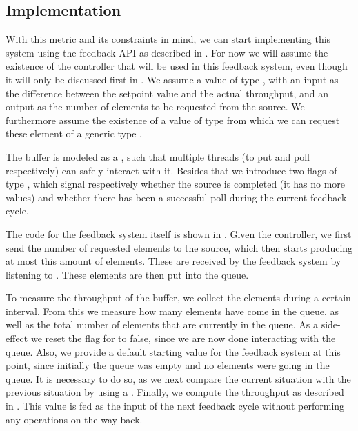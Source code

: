 \subsection*{Implementation}
With this metric and its constraints in mind, we can start implementing this system using the feedback API as described in . For now we will assume the existence of the controller that will be used in this feedback system, even though it will only be discussed first in . We assume a value  of type , with an input as the difference between the setpoint value and the actual throughput, and an output as the number of elements to be requested from the source. We furthermore assume the existence of a value  of type  from which we can request these element of a generic type .

The buffer is modeled as a , such that multiple threads (to put and poll respectively) can safely interact with it. Besides that we introduce two flags of type , which signal respectively whether the source is completed (it has no more values) and whether there has been a successful poll during the current feedback cycle.

The code for the feedback system itself is shown in . Given the controller, we first send the number of requested elements to the source, which then starts producing at most this amount of elements. These are received by the feedback system by listening to . These elements are then put into the queue.

To measure the throughput of the buffer, we collect the elements during a certain interval. From this we measure how many elements have come in the queue, as well as the total number of elements that are currently in the queue. As a side-effect we reset the flag for  to false, since we are now done interacting with the queue. Also, we provide a default starting value for the feedback system at this point, since initially the queue was empty and no elements were going in the queue. It is necessary to do so, as we next compare the current situation with the previous situation by using a . Finally, we compute the throughput as described in . This value is fed as the input of the next feedback cycle without performing any operations on the way back.

